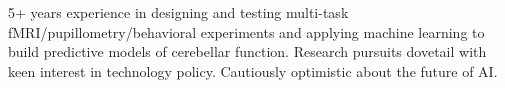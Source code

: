 

\begin{cvparagraph}

5+ years experience in designing and testing multi-task fMRI/pupillometry/behavioral experiments and applying machine learning to build predictive models of cerebellar function. Research pursuits dovetail with keen interest in technology policy. Cautiously optimistic about the future of AI.

\end{cvparagraph}

